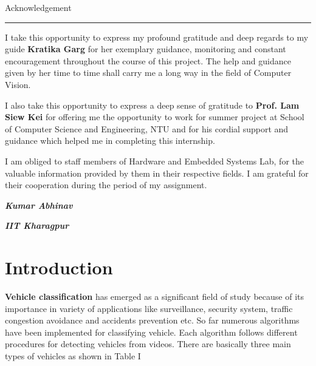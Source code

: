 \documentclass[a4paper,12pt]{article}
\begin{document}
	\newpage
	\begin{center}
		\vspace*{1in}
		{\LARGE Acknowledgement}
		\vspace{0.1in}
		\hrule
		\vspace{0.1in}
	\end{center}
	\vspace{0.25in}
	I take this opportunity to express my profound gratitude and deep regards to my guide \textbf{Kratika Garg} for her exemplary guidance, monitoring and constant encouragement throughout the course of this project. The help and guidance given by her time to time shall carry me a long way in the field of Computer Vision.
	\begin{flushleft}
	I also take this opportunity to express a deep sense of gratitude to \textbf{Prof. Lam Siew Kei} for offering me the opportunity to work for summer project at School of Computer Science and Engineering, NTU and for his cordial support and guidance which helped me in completing this internship. 
	\end{flushleft}
	\begin{flushleft}
	I am obliged to staff members of Hardware and Embedded Systems Lab, for the valuable information provided by them in their respective fields. I am grateful for their cooperation during the period of my assignment.
	\end{flushleft}
	\vspace{2.5in}
	
	\begin{flushleft}
		\textbf{\textit{Kumar Abhinav}}
		\par
		\textbf{\textit{IIT Kharagpur}}
	\end{flushleft}


\tableofcontents

\newpage
\section{Introduction}

\vspace{0.1in}
\textbf{Vehicle classification} has emerged as a significant field of study because of its importance in variety of applications like surveillance, security system, traffic congestion avoidance and accidents prevention etc. So far numerous algorithms have been implemented for
classifying vehicle. Each algorithm follows different procedures for detecting vehicles from videos. There are basically three main types of vehicles as shown in Table I
\end{document}
